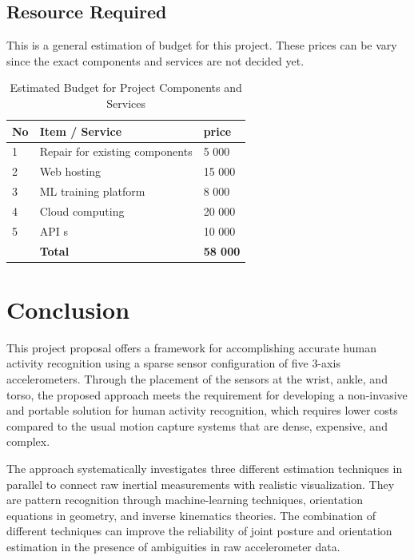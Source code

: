 \documentclass[12pt, a4paper, oneside]{report}
\begin{document}
\section{Resource Required}
This is a general estimation of budget for this project. These prices can be vary since the exact components and services are not decided yet.

\begin{table}[H]
    \centering
    \caption{Estimated Budget for Project Components and Services}
    \label{tab:project_budget}
    \begin{tabular}{|l|l|l|}
        \hline
        \textbf{No} & \textbf{Item / Service} & \textbf{price} \\ \hline
        1 & Repair for existing components & 5 000 \\ \hline
        2 & Web hosting & 15 000 \\ \hline
        3 & ML training platform & 8 000 \\ \hline
        4 & Cloud computing & 20 000 \\ \hline
        5 & API s & 10 000 \\ \hline
          & \textbf{Total} & \textbf{58 000} \\ \hline
    \end{tabular}
\end{table}



\chapter{Conclusion}
\noindent This project proposal offers a framework for accomplishing accurate human activity recognition using a sparse sensor configuration of five 3-axis accelerometers. Through the placement of the sensors at the wrist, ankle, and torso, the proposed approach meets the requirement for developing a non-invasive and portable solution for human activity recognition, which requires lower costs compared to the usual motion capture systems that are dense, expensive, and complex. \vspace{\baselineskip}


\noindent The approach systematically investigates three different estimation techniques in parallel to connect raw inertial measurements with realistic visualization. They are pattern recognition through machine-learning techniques, orientation equations in geometry, and inverse kinematics theories. The combination of different techniques can improve the reliability of joint posture and orientation estimation in the presence of ambiguities in raw accelerometer data.\vspace{\baselineskip}
\end{document}

